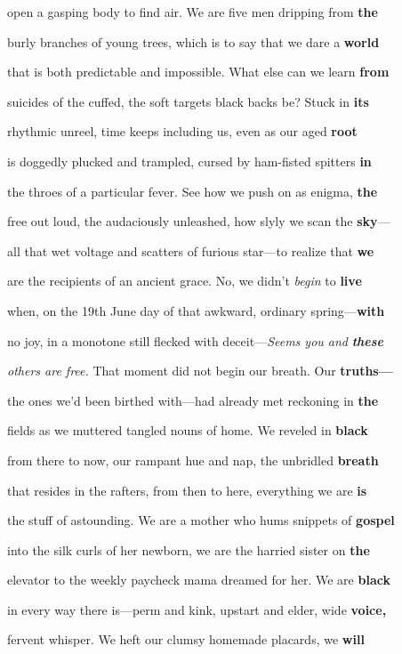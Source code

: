 open a gasping body to find air. We are five men dripping from
\textbf{the}

burly branches of young trees, which is to say that we dare a
\textbf{world}

that is both predictable and impossible. What else can we learn
\textbf{from}

suicides of the cuffed, the soft targets black backs be? Stuck in
\textbf{its}

rhythmic unreel, time keeps including us, even as our aged \textbf{root}

is doggedly plucked and trampled, cursed by ham-fisted spitters
\textbf{in}

the throes of a particular fever. See how we push on as enigma,
\textbf{the}

free out loud, the audaciously unleashed, how slyly we scan the
\textbf{sky}---

all that wet voltage and scatters of furious star---to realize that
\textbf{we}

are the recipients of an ancient grace. No, we didn't \emph{begin} to
\textbf{live}

when, on the 19th June day of that awkward, ordinary
spring---\textbf{with}

no joy, in a monotone still flecked with deceit---\emph{Seems you and}
\emph{\textbf{these}}

\emph{others are free.} That moment did not begin our breath. Our
\textbf{truths---}

the ones we'd been birthed with---had already met reckoning in
\textbf{the}

fields as we muttered tangled nouns of home. We reveled in
\textbf{black}

from there to now, our rampant hue and nap, the unbridled
\textbf{breath}

that resides in the rafters, from then to here, everything we are
\textbf{is}

the stuff of astounding. We are a mother who hums snippets of
\textbf{gospel}

into the silk curls of her newborn, we are the harried sister on
\textbf{the}

elevator to the weekly paycheck mama dreamed for her. We are
\textbf{black}

in every way there is---perm and kink, upstart and elder, wide
\textbf{voice,}

fervent whisper. We heft our clumsy homemade placards, we \textbf{will}

